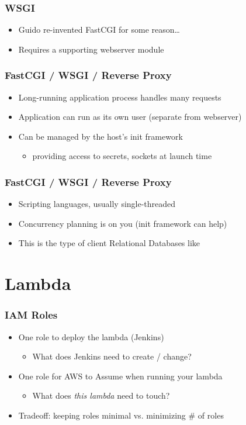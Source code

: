 \documentclass{beamer}
\begin{document}
\begin{frame}
	\frametitle{WSGI}
	\begin{itemize}
		\item Guido re-invented FastCGI for some reason\ldots
		\pause \item Requires a supporting webserver module
	\end{itemize}
\end{frame}

\begin{frame}
	\frametitle{FastCGI / WSGI / Reverse Proxy}
	\begin{itemize}
		\item Long-running application process handles many requests
		\pause \item Application can run as its own user (separate from webserver)
		\pause \item Can be managed by the host's init framework
			\begin{itemize}
				\item providing access to secrets, sockets at launch time
			\end{itemize}
	\end{itemize}
\end{frame}

\begin{frame}
	\frametitle{FastCGI / WSGI / Reverse Proxy}
	\begin{itemize}
		\item Scripting languages, usually single-threaded
		\pause \item Concurrency planning is on you (init framework can help)
		\pause \item This is the type of client Relational Databases like
	\end{itemize}
\end{frame}

\section{Lambda}
\frame{\sectionpage}

\begin{frame}
	\frametitle{IAM Roles}
	\begin{itemize}
		\item One role to deploy the lambda (Jenkins)
			\begin{itemize}
				\item What does Jenkins need to create / change?
			\end{itemize}
		\pause \item One role for \alert{AWS to Assume} when running your lambda
			\begin{itemize}
				\item What does \emph{this lambda} need to touch?
			\end{itemize}
		\pause \item Tradeoff: keeping roles minimal vs. minimizing \# of roles
	\end{itemize}
\end{frame}
\end{document}
